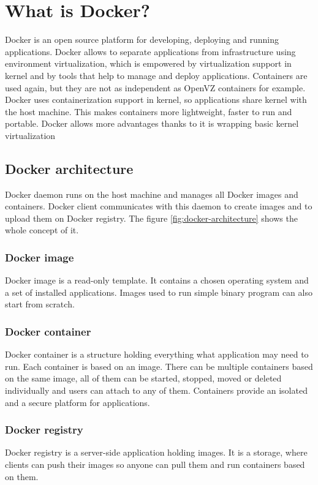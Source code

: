 \chapter{What is Docker?}
Docker is an open source platform for developing, deploying and running applications. Docker allows to separate applications from infrastructure using environment virtualization, which is empowered by virtualization support  in kernel and by tools that help to manage and deploy applications. Containers are used again, but they are not as independent as OpenVZ containers for example. Docker uses containerization support in kernel, so applications share kernel with the host machine. This makes containers more lightweight, faster to run and portable. Docker allows more advantages thanks to it is wrapping basic kernel virtualization

\section{Docker architecture}
Docker daemon runs on the host machine and manages all Docker images and containers. Docker client communicates with this daemon to create images and to upload them on Docker registry. The figure \ref{fig:docker-architecture} shows the whole concept of it.

\subsection{Docker image}
Docker image is a read-only template. It contains a chosen operating system and a set of installed applications. Images used to run simple binary program can also start from scratch.

\subsection{Docker container}
Docker container is a structure holding everything what application may need to run. Each container is based on an image. There can be multiple containers based on the same image, all of them can be started, stopped, moved or deleted individually and users can attach to any of them. Containers provide an isolated and a secure platform for applications.

\subsection{Docker registry}
Docker registry is a server-side application holding images. It is a storage, where clients can push their images so anyone can pull them and run containers based on them.

